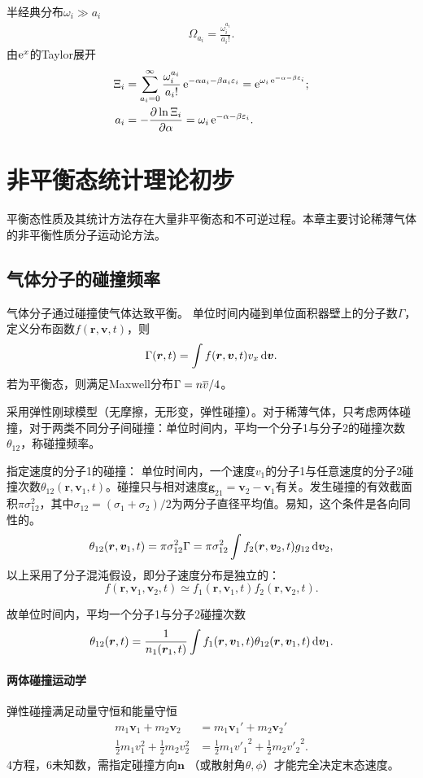 半经典分布$\omega_i\gg a_i$ 
\begin{align}
	\Omega_{a_i}=\frac{\omega_i^{a_i}}{a_i!}.
\end{align}
由$\mathop{}\!\mathrm{e}^{x}$的Taylor展开
\begin{align}
	\Xi_i&=\sum_{a_i=0}^\infty\frac{\omega_i^{a_i}}{a_i!}\e{-\alpha a_i-\beta a_i\varepsilon_i}=\e{\omega_i\e{-\alpha-\beta\varepsilon_i}};\\
	a_i&=-\pv{\ln\Xi_i}\alpha=\omega_i\e{-\alpha-\beta\varepsilon_i}.
\end{align}
\clearpage
\section{非平衡态统计理论初步}
平衡态性质及其统计方法存在大量非平衡态和不可逆过程。本章主要讨论稀薄气体的非平衡性质分子运动论方法。
\subsection{气体分子的碰撞频率}
气体分子通过碰撞使气体达致平衡。
单位时间内碰到单位面积器壁上的分子数$\Gamma$，定义分布函数$f(\bm r,\bm v,t)$，则
\[
	\Gamma(\bm r,t)=\int f(\bm r,\bm v,t)v_x\mathop{}\!\mathrm{d}\bm v.
\]
若为平衡态，则满足Maxwell分布$\Gamma=n\overline v/4$。

采用弹性刚球模型（无摩擦，无形变，弹性碰撞）。对于稀薄气体，只考虑两体碰撞，对于两类不同分子间碰撞：单位时间内，平均一个分子1与分子2的碰撞次数$\theta_{12}$，称碰撞频率。

指定速度的分子1的碰撞：
单位时间内，一个速度$v_1$的分子1与任意速度的分子2碰撞次数$\theta_{12}(\bm r,\bm v_1,t)$。碰撞只与相对速度$\bm g_{21}=\bm v_2-\bm v_1$有关。发生碰撞的有效截面积$\pi\sigma^2_{12}$，其中$\sigma_{12}=(\sigma_1+\sigma_2)/2$为两分子直径平均值。易知，这个条件是各向同性的。
\begin{align}
	\theta_{12}(\bm r,\bm v_1,t)=\pi\sigma_{12}^2\Gamma=\pi\sigma_{12}^2\int f_2(\bm r,\bm v_2,t)g_{12}\mathop{}\!\mathrm{d}\bm v_2,
\end{align}
以上采用了分子混沌假设，即分子速度分布是独立的：
\[
	f(\bm r,\bm v_1,\bm v_2,t)\simeq f_1(\bm r,\bm v_1,t)f_2(\bm r,\bm v_2,t).
\]

故单位时间内，平均一个分子1与分子2碰撞次数
\begin{align}
	\theta_{12}(\bm r,t)=\frac1{n_1(\bm r_1,t)}\int f_1(\bm r,\bm v_1,t)\theta_{12}(\bm r,\bm v_1,t)\mathop{}\!\mathrm{d}\bm v_1.
\end{align}
\paragraph*{两体碰撞运动学}
弹性碰撞满足动量守恒和能量守恒
\begin{align}
	m_1\bm v_1+m_2\bm v_2&=m_1\bm v_1'+m_2\bm v_2'\\
	\frac12m_1v_1^2+\frac12m_2v_2^2&=\frac12m_1{v'_1}^2+\frac12m_2{v'_2}^2.
\end{align}
4方程，6未知数，需指定碰撞方向$\bm n$ （或散射角$\theta,\phi$）才能完全决定末态速度。

